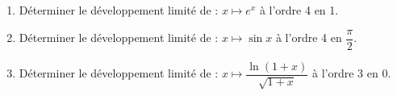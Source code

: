 
\begin{exercice}\label{exoautoanalyseCTU-43}

\begin{enumerate}
\item Déterminer le développement limité de : $x \mapsto e^{x}$ à l'ordre 4 en 1.
\item Déterminer le développement limité de : $x \mapsto \sin x$ à l'ordre 4 en $\dfrac{\pi}{2}$.
\item Déterminer le développement limité de : $x \mapsto \dfrac{\ln(1+x)}{\sqrt{1+x}}$ à l'ordre 3 en 0.

\end{enumerate}


\end{exercice}
